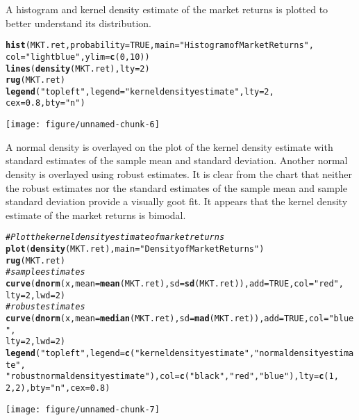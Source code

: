 \documentclass[a4paper]{article}\usepackage[]{graphicx}\usepackage[]{color}
\makeatletter
\def\maxwidth{ %
  \ifdim\Gin@nat@width>\linewidth
    \linewidth
  \else
    \Gin@nat@width
  \fi
}
\newcommand{\hlstr}[1]{\textcolor[rgb]{0.192,0.494,0.8}{#1}}%
\newcommand{\hlcom}[1]{\textcolor[rgb]{0.678,0.584,0.686}{\textit{#1}}}%
\newcommand{\hlkwd}[1]{\textcolor[rgb]{0.737,0.353,0.396}{\textbf{#1}}}%
\newenvironment{kframe}{%
 \def\at@end@of@kframe{}%
 \ifinner\ifhmode%
  \def\at@end@of@kframe{\end{minipage}}%
  \begin{minipage}{\columnwidth}%
 \fi\fi%
 \def\FrameCommand##1{\hskip\@totalleftmargin \hskip-\fboxsep
 \colorbox{shadecolor}{##1}\hskip-\fboxsep
     \hskip-\linewidth \hskip-\@totalleftmargin \hskip\columnwidth}%
 \MakeFramed {\advance\hsize-\width
   \@totalleftmargin\z@ \linewidth\hsize
   \@setminipage}}%
 {\par\unskip\endMakeFramed%
 \at@end@of@kframe}
\newenvironment{knitrout}{}{} %
\makeatother
\begin{document}
A histogram and kernel density estimate of the market returns is plotted to better understand its distribution. 
\begin{knitrout}
\color{fgcolor}\begin{kframe}
\begin{alltt}
\hlkwd{hist}(MKT.ret, probability=TRUE, main=\hlstr{"Histogram of Market Returns"}, 
     col=\hlstr{"lightblue"}, ylim=\hlkwd{c}(0, 10))
\hlkwd{lines}(\hlkwd{density}(MKT.ret), lty=2)
\hlkwd{rug}(MKT.ret)
\hlkwd{legend}(\hlstr{"topleft"}, legend=\hlstr{"kernel density estimate"}, lty=2,
       cex=0.8, bty=\hlstr{"n"})
\end{alltt}
\end{kframe}
\texttt{[image: figure/unnamed-chunk-6]} 

\end{knitrout}



A normal density is overlayed on the plot of the kernel density estimate with standard estimates of the sample mean and standard deviation. Another normal density is overlayed using robust estimates. It is clear from the chart that neither the robust estimates nor the standard estimates of the sample mean and sample standard deviation provide a visually goot fit. It appears that the kernel density estimate of the market returns is bimodal.
\begin{knitrout}
\color{fgcolor}\begin{kframe}
\begin{alltt}
\hlcom{# Plot the kernel density estimate of market returns}
\hlkwd{plot}(\hlkwd{density}(MKT.ret), main = \hlstr{"Density of Market Returns"})
\hlkwd{rug}(MKT.ret)
\hlcom{# sample estimates}
\hlkwd{curve}(\hlkwd{dnorm}(x, mean = \hlkwd{mean}(MKT.ret), sd = \hlkwd{sd}(MKT.ret)), add = TRUE, col = \hlstr{"red"}, 
    lty = 2, lwd = 2)
\hlcom{# robust estimates}
\hlkwd{curve}(\hlkwd{dnorm}(x, mean = \hlkwd{median}(MKT.ret), sd = \hlkwd{mad}(MKT.ret)), add = TRUE, col = \hlstr{"blue"}, 
    lty = 2, lwd = 2)
\hlkwd{legend}(\hlstr{"topleft"}, legend = \hlkwd{c}(\hlstr{"kernel density estimate"}, \hlstr{"normal density estimate"}, 
    \hlstr{"robust normal density estimate"}), col = \hlkwd{c}(\hlstr{"black"}, \hlstr{"red"}, \hlstr{"blue"}), lty = \hlkwd{c}(1, 
    2, 2), bty = \hlstr{"n"}, cex = 0.8)
\end{alltt}
\end{kframe}
\texttt{[image: figure/unnamed-chunk-7]} 

\end{knitrout}
\end{document}
